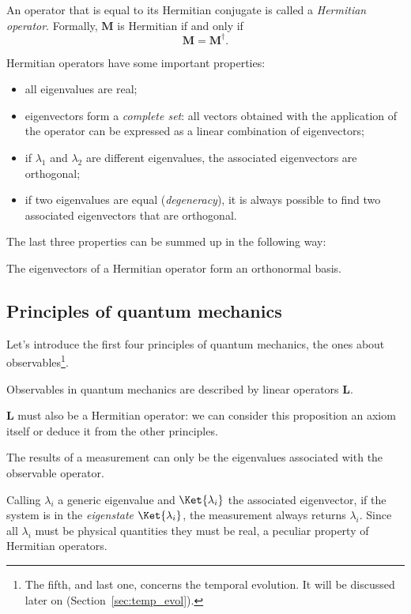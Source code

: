 An operator that is equal to its Hermitian conjugate is called a \emph{Hermitian operator}. Formally, $\mathbf{M}$ is Hermitian if and only if
\[
\mathbf{M} = \mathbf{M}^\dagger.
\]

Hermitian operators have some important properties:
\begin{itemize}
	\item all eigenvalues are real;
	\item eigenvectors form a \emph{complete set}: all vectors obtained with the application of the operator can be expressed as a linear combination of eigenvectors;
	\item if $\lambda_1$ and $\lambda_2$ are different eigenvalues, the associated eigenvectors are orthogonal;
	\item if two eigenvalues are equal (\emph{degeneracy}), it is always possible to find two associated eigenvectors that are orthogonal.
\end{itemize}

The last three properties can be summed up in the following way:
\begin{theorem}
	The eigenvectors of a Hermitian operator form an orthonormal basis.
\end{theorem} 

\subsection{Principles of quantum mechanics}\label{sec:principles}
Let's introduce the first four principles of quantum mechanics, the ones about observables\footnote{The fifth, and last one, concerns the temporal evolution. It will be discussed later on (Section~\ref{sec:temp_evol}).}.
\begin{principles}
	Observables in quantum mechanics are described by linear operators $\mathbf{L}$.
\end{principles}
$\mathbf{L}$ must also be a Hermitian operator: we can consider this proposition an axiom itself or deduce it from the other principles.

\begin{principles}
	The results of a measurement can only be the eigenvalues associated with the observable operator.
\end{principles}                                                                                                         
Calling $\lambda_i$ a generic eigenvalue and $\Ket{\lambda_i}$ the associated eigenvector, if the system is in the \emph{eigenstate} $\Ket{\lambda_i}$, the measurement always returns $\lambda_i$. Since all $\lambda_i$ must be physical quantities they must be real, a peculiar property of Hermitian operators.

